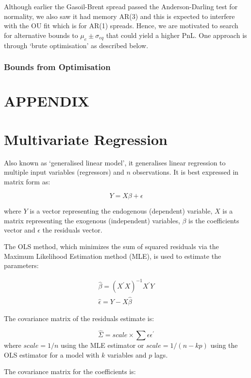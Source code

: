 \documentclass{article}
\begin{document}
    Although earlier the Gasoil-Brent spread passed the Anderson-Darling
test for normality, we also saw it had memory AR(3) and this is expected
to interfere with the OU fit which is for AR(1) spreads. Hence, we are
motivated to search for alternative bounds to \(\mu_e \pm \sigma_{eq}\)
that could yield a higher PnL. One approach is through `brute
optimisation' as described below.

    \subsubsection{Bounds from Optimisation}\label{bounds-from-optimisation}

    \section{APPENDIX}\label{appendix}

    \section{Multivariate Regression}\label{multivariate-regression}

Also known as `generalised linear model', it generalises linear
regression to multiple input variables (regressors) and \(n\)
observations. It is best expressed in matrix form as:

\[
Y = X \beta + \epsilon
\]

where \(Y\) is a vector representing the endogenous (dependent)
variable, \(X\) is a matrix representing the exogenous (independent)
variables, \(\beta\) is the coefficients vector and \(\epsilon\) the
residuals vector.

The OLS method, which minimizes the sum of squared residuals via the
Maximum Likelihood Estimation method (MLE), is used to estimate the
parameters:

\[
\begin{align}
\hat{\beta} = (X^\prime X)^{-1} X^\prime Y \\
\hat{\epsilon} = Y - X \hat{\beta}
\end{align}
\]

The covariance matrix of the residuals estimate is:

\[
\hat{\Sigma} = scale \times  \sum \epsilon \epsilon^\prime
\] where \(scale = 1/ n\) using the MLE estimator or
\(scale= 1/ (n - kp)\) using the OLS estimator for a model with \(k\)
variables and \(p\) lags.

The covariance matrix for the coefficients is:
\end{document}
